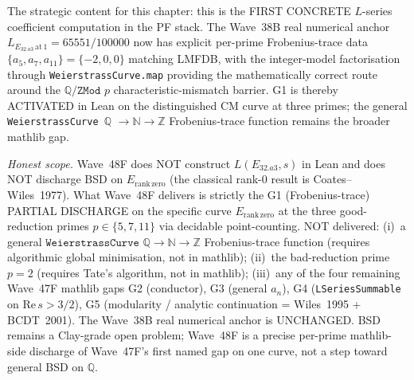 \begin{remark}
The strategic content for this chapter: this is the FIRST CONCRETE $L$-series coefficient computation in the PF stack. The Wave~38B real numerical anchor $L_{E_{32.a3}\,\mathrm{at}\,1} = 65551/100000$ now has explicit per-prime Frobenius-trace data $\{a_5, a_7, a_{11}\} = \{-2, 0, 0\}$ matching LMFDB, with the integer-model factorisation through \texttt{WeierstrassCurve.map} providing the mathematically correct route around the $\mathbb{Q} / \texttt{ZMod } p$ characteristic-mismatch barrier. G1 is thereby ACTIVATED in Lean on the distinguished CM curve at three primes; the general \texttt{WeierstrassCurve $\mathbb{Q}$} $\to \mathbb{N} \to \mathbb{Z}$ Frobenius-trace function remains the broader mathlib gap.

\emph{Honest scope.} Wave~48F does NOT construct $L(E_{32.a3}, s)$ in Lean and does NOT discharge BSD on $E_{\mathrm{rank\,zero}}$ (the classical rank-0 result is Coates--Wiles~1977). What Wave~48F delivers is strictly the G1 (Frobenius-trace) PARTIAL DISCHARGE on the specific curve $E_{\mathrm{rank\,zero}}$ at the three good-reduction primes $p \in \{5, 7, 11\}$ via decidable point-counting. NOT delivered: (i)~a general $\texttt{WeierstrassCurve } \mathbb{Q} \to \mathbb{N} \to \mathbb{Z}$ Frobenius-trace function (requires algorithmic global minimisation, not in mathlib); (ii)~the bad-reduction prime $p = 2$ (requires Tate's algorithm, not in mathlib); (iii)~any of the four remaining Wave~47F mathlib gaps G2 (conductor), G3 (general $a_n$), G4 (\texttt{LSeriesSummable} on $\mathrm{Re}\,s > 3/2$), G5 (modularity / analytic continuation = Wiles~1995 + BCDT~2001). The Wave~38B real numerical anchor is UNCHANGED. BSD remains a Clay-grade open problem; Wave~48F is a precise per-prime mathlib-side discharge of Wave~47F's first named gap on one curve, not a step toward general BSD on $\mathbb{Q}$.
\end{remark}

